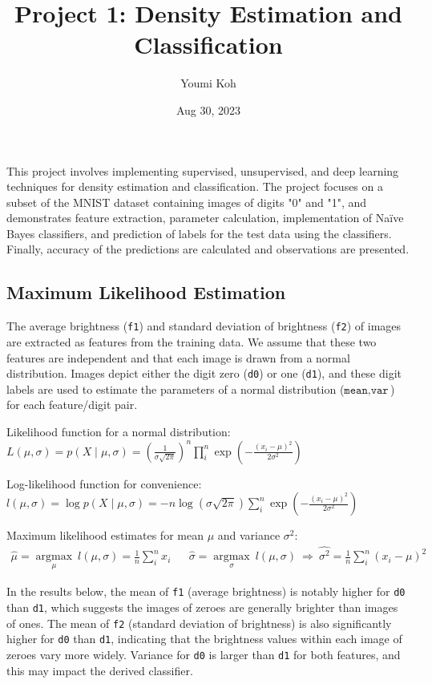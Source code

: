 \documentclass{article}
\title{Project 1: Density Estimation and Classification}
\author{Youmi Koh}
\date{Aug 30, 2023}
\begin{document}
\maketitle
\noindent
This project involves implementing supervised, unsupervised, and deep learning techniques for density estimation and classification.  The project focuses on a subset of the MNIST dataset
containing images of digits "0" and "1", and demonstrates feature extraction, parameter calculation, implementation of Naïve Bayes classifiers, and prediction of labels for the test data using
the classifiers. Finally, accuracy of the predictions are calculated and observations are presented.

\subsection*{Maximum Likelihood Estimation}

The average brightness (\texttt{f1}) and standard deviation of brightness (\texttt{f2}) of images are extracted as features from the training data. We assume that these two features are independent and that each image is drawn from a normal distribution. Images depict either the digit zero (\texttt{d0}) or one (\texttt{d1}), and these digit labels are used to estimate the parameters of a normal distribution ($\texttt{mean},\texttt{var}$) for each feature/digit pair.

Likelihood function for a normal distribution: ${\displaystyle L(\mu, \sigma) = p(X\mid\mu,\sigma) = \left(\frac{1}{\sigma\sqrt{2\pi}}\right)^n \prod_i^n \exp\left(-\frac{(x_i - \mu)^2}{2\sigma^2} \right)}$

Log-likelihood function for convenience: ${\displaystyle l(\mu, \sigma) = \operatorname{log}p(X\mid\mu,\sigma) = -n \operatorname{log}(\sigma\sqrt{2 \pi}) \sum_i^n \exp\left(-\frac{(x_i - \mu)^2}{2\sigma^2} \right)}$

Maximum likelihood estimates for mean $\mu$ and variance $\sigma^2$:$$
\begin{array}{lcr}
{\displaystyle \hat{\mu} = {\underset {\mu}{\operatorname {argmax} }}\ l(\mu, \sigma) = \frac{1}{n} \sum_i^n {x_i}}
&& {\displaystyle \hat{\sigma} = {\underset {\sigma}{\operatorname {argmax} }}\ l(\mu, \sigma)\ \Rightarrow\ \widehat{\sigma^2} = \frac{1}{n} \sum_i^n {(x_i-\mu)^2}}
\end{array}
$$

In the results below, the mean of \texttt{f1} (average brightness) is notably higher for \texttt{d0} than \texttt{d1}, which suggests the images of zeroes are generally brighter than images of ones. The mean of \texttt{f2} (standard deviation of brightness) is also significantly higher for \texttt{d0} than \texttt{d1}, indicating that the brightness values within each image of zeroes vary more widely. Variance for \texttt{d0} is larger than \texttt{d1} for both features, and this may impact the derived classifier.
\end{document}
